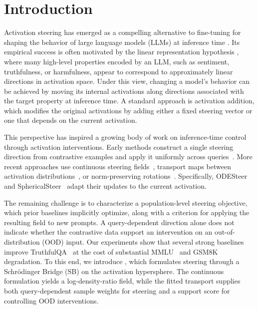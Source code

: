\section{Introduction}
Activation steering has emerged as a compelling alternative to fine-tuning for shaping the behavior of large language models (LLMs) at inference time \citep{rimsky2024steering, li2023inference, wang2025truthflow}. Its empirical success is often motivated by the linear representation hypothesis \citep{park2023linear, alain2016understanding}, where many high-level properties encoded by an LLM, such as sentiment, truthfulness, or harmfulness, appear to correspond to approximately linear directions in activation space. Under this view, changing a model's behavior can be achieved by moving its internal activations along directions associated with the target property at inference time. A standard approach is activation addition, which modifies the original activations by adding either a fixed steering vector or one that depends on the current activation.

This perspective has inspired a growing body of work on inference-time control through activation interventions. Early methods construct a single steering direction from contrastive examples and apply it uniformly across queries~\citep{rimsky2024steering}. More recent approaches use continuous steering fields~\citep{zhaoodesteer, wang2025truthflow}, transport maps between activation distributions~\citep{rodriguez2025controlling}, or norm-preserving rotations~\citep{you2026spherical, pham2024householder}. Specifically, ODESteer~\citep{zhaoodesteer} and SphericalSteer~\citep{you2026spherical} adapt their updates to the current activation.

The remaining challenge is to characterize a population-level steering objective, which prior baselines implicitly optimize, along with a criterion for applying the resulting field to new prompts. A query-dependent direction alone does not indicate whether the contrastive data support an intervention on an out-of-distribution (OOD) input. Our experiments show that several strong baselines improve TruthfulQA~\citep{lin2021truthfulqa} at the cost of substantial MMLU~\citep{hendrycks2020measuring} and GSM8K~\citep{cobbe2021gsm8k} degradation. To this end, we introduce \Cobras, which formulates steering through a Schr\"{o}dinger Bridge (SB) on the activation hypersphere. The continuous formulation yields a log-density-ratio field, while the fitted transport supplies both query-dependent sample weights for steering and a support score for controlling OOD interventions.

